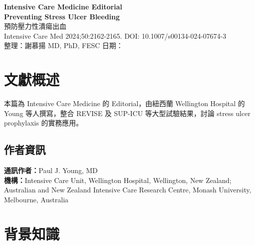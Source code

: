 \documentclass[12pt,a4paper]{article}
\begin{document}
\begin{center}
{\LARGE\bfseries\textcolor{emergency_red}{Intensive Care Medicine Editorial}}\\[0.5cm]
{\Large\textbf{Preventing Stress Ulcer Bleeding}}\\[0.3cm]
{\large 預防壓力性潰瘍出血}\\[0.5cm]
{\normalsize Intensive Care Med 2024;50:2162-2165. DOI: 10.1007/s00134-024-07674-3}\\[0.3cm]
{\normalsize 整理：謝慕揚 MD, PhD, FESC \quad 日期：\mydate}
\end{center}


\tableofcontents
\newpage

\section{文獻概述}

本篇為 Intensive Care Medicine 的 Editorial，由紐西蘭 Wellington Hospital 的 Young 等人撰寫，整合 REVISE 及 SUP-ICU 等大型試驗結果，討論 stress ulcer prophylaxis 的實務應用。

\subsection{作者資訊}
\textbf{通訊作者：}Paul J. Young, MD\\
\textbf{機構：}Intensive Care Unit, Wellington Hospital, Wellington, New Zealand; Australian and New Zealand Intensive Care Research Centre, Monash University, Melbourne, Australia

\section{背景知識}
\end{document}
